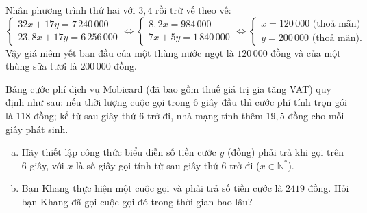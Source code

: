 \begin{bt}
{Nhân phương trình thứ hai với $3{,}4$ rồi trừ vế theo vế:
$$ \begin{cases} 32x + 17y = 7\,240\,000 \\ 23{,}8x + 17y = 6\,256\,000 \end{cases} \iff \begin{cases} 8{,}2x = 984\,000 \\ 7x + 5y = 1\,840\,000 \end{cases} \iff \begin{cases} x = 120\,000\text{ (thoả mãn)} \\ y = 200\,000\text{ (thoả mãn)}. \end{cases} $$
Vậy giá niêm yết ban đầu của một thùng nước ngọt là $120\,000$ đồng và của một thùng sữa tươi là $200\,000$ đồng.
}
\end{bt}

\begin{bt}%
Bảng cước phí dịch vụ Mobicard (đã bao gồm thuế giá trị gia tăng VAT) quy định như sau: nếu thời lượng cuộc gọi trong $6$ giây đầu thì cước phí tính trọn gói là $118$ đồng; kể từ sau giây thứ $6$ trở đi, nhà mạng tính thêm $19{,}5$ đồng cho mỗi giây phát sinh.
\begin{enumerate}[a)]
	\item Hãy thiết lập công thức biểu diễn số tiền cước $y$ (đồng) phải trả khi gọi trên $6$ giây, với $x$ là số giây gọi tính từ sau giây thứ $6$ trở đi ($x \in \mathbb{N}^*$).
	\item Bạn Khang thực hiện một cuộc gọi và phải trả số tiền cước là $2419$ đồng. Hỏi bạn Khang đã gọi cuộc gọi đó trong thời gian bao lâu?
\end{enumerate}
\end{bt}

